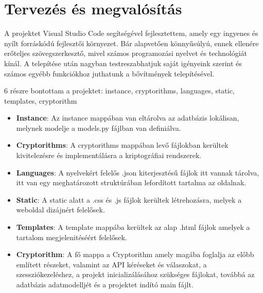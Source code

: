 \chapter{Tervezés és megvalósítás}

A projektet Visual Studio Code segítségével fejlesztettem, amely egy ingyenes és nyílt forráskódú fejlesztői környezet. Bár alapvetően könnyűsúlyú, ennek ellenére erőteljes szövegszerkesztő, mivel számos programozási nyelvet és technológiát kínál. A telepítése után nagyban testreszabhatjuk saját igényeink szerint és számos egyébb funkciókhoz juthatunk a bővítmények telepítésével.

6 részre bontottam a projektet: instance, cryptorithms, languages, static, templates, cryptorithm 

\begin{itemize}
	\item\textbf{Instance}:
Az instance mappában van eltárolva az adatbázis lokálisan, melynek modelje a models.py fájlban van definiálva.

	\item\textbf{Cryptorithms}:
A cryptorithms mappában levő fájlokban kerültek kivitelezésre és implementálásra a kriptográfiai rendszerek.

	\item\textbf{Languages}:
A nyelvekért felelős .json kiterjesztésű fájlok itt vannak tárolva, itt van egy meghatározott struktúrában lefordított tartalma az oldalnak.

	\item\textbf{Static}:
A static alatt a .css és .js fájlok kerültek létrehozásra, melyek a weboldal dizájnért felelősek.

	\item\textbf{Templates}:
A template mappába kerültek az alap .html fájlok amelyek a tartalom megjelenitéséért felelősek.

	\item\textbf{Cryptorithm}:
A fő mappa a Cryptorithm amely magába foglalja az előbb említett részeket, valamint az API kéréseket és válaszokat, a szessziókezeléshez, a projekt inicializálásához szükséges fájlokat, továbbá az adatbázis adatmodelljét és a projektet indító main fájlt.

\end{itemize}

